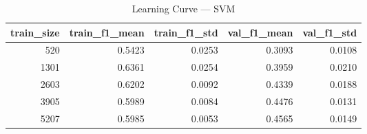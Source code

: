 \begin{table}
\caption{Learning Curve — SVM}
\begin{tabular}{rrrrr}
\toprule
train_size & train_f1_mean & train_f1_std & val_f1_mean & val_f1_std \\
\midrule
520 & 0.5423 & 0.0253 & 0.3093 & 0.0108 \\
1301 & 0.6361 & 0.0254 & 0.3959 & 0.0210 \\
2603 & 0.6202 & 0.0092 & 0.4339 & 0.0188 \\
3905 & 0.5989 & 0.0084 & 0.4476 & 0.0131 \\
5207 & 0.5985 & 0.0053 & 0.4565 & 0.0149 \\
\bottomrule
\end{tabular}
\end{table}
